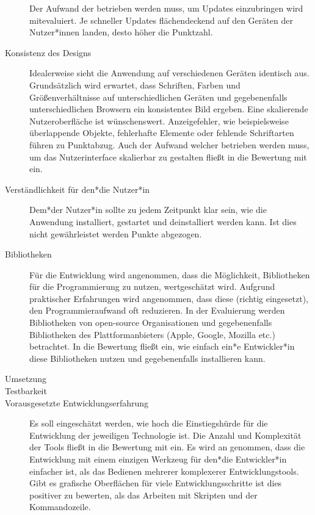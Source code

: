 \begin{description}
	      Der Aufwand der betrieben werden muss, um Updates einzubringen wird mitevaluiert. Je schneller Updates flächendeckend auf den Geräten der Nutzer*innen landen, desto höher die Punktzahl.

	\item [Konsistenz des Designs]
	      Idealerweise sieht die Anwendung auf verschiedenen Geräten identisch aus. Grundsätzlich wird erwartet, dass Schriften, Farben und Größenverhältnisse auf unterschiedlichen Geräten und gegebenenfalls unterschiedlichen Browsern ein konsistentes Bild ergeben.
	      Eine skalierende Nutzeroberfläche ist wünschenswert. Anzeigefehler, wie beispielsweise überlappende Objekte, fehlerhafte Elemente oder fehlende Schriftarten führen zu Punktabzug. Auch der Aufwand welcher betrieben werden muss, um das Nutzerinterface skalierbar zu gestalten fließt in die Bewertung mit ein.

	\item[Verständlichkeit für den*die Nutzer*in]
	      Dem*der Nutzer*in sollte zu jedem Zeitpunkt klar sein, wie die Anwendung installiert, gestartet und deinstalliert werden kann. Ist dies nicht gewährleistet werden Punkte abgezogen.

	\item[Bibliotheken]
		Für die Entwicklung wird angenommen, dass die Möglichkeit, Bibliotheken für die Programmierung zu nutzen, wertgeschätzt wird. Aufgrund praktischer Erfahrungen wird angenommen, dass diese (richtig eingesetzt), den Programmieraufwand oft reduzieren. In der Evaluierung werden Bibliotheken von open-source Organisationen und gegebenenfalls Bibliotheken des Plattformanbieters (Apple, Google, Mozilla etc.) betrachtet. In die Bewertung fließt ein, wie einfach ein*e Entwickler*in diese Bibliotheken nutzen und gegebenenfalls installieren kann. 

	\item[Umsetzung]
		
	\item[Testbarkeit]
	
	\item[Vorausgesetzte Entwicklungserfahrung]
		Es soll eingeschätzt werden, wie hoch die Einstiegshürde für die Entwicklung der jeweiligen Technologie ist. Die Anzahl und Komplexität der Tools fließt in die Bewertung mit ein. Es wird an genommen, dass die Entwicklung mit einem einzigen Werkzeug für den*die Entwickler*in einfacher ist, als das Bedienen mehrerer komplexerer Entwicklungstools. Gibt es grafische Oberflächen für viele Entwicklungsschritte ist dies positiver zu bewerten, als das Arbeiten mit Skripten und der Kommandozeile.
		
\end{description}

